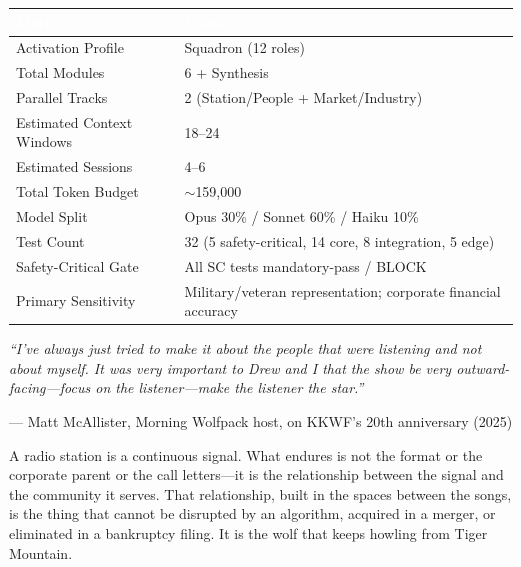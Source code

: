 \documentclass[11pt,letterpaper]{article}
\newcommand{\tableheader}[1]{\textbf{\sffamily\textcolor{white}{#1}}}
\begin{document}
\begin{center}
\begin{tabularx}{\textwidth}{L{4cm}X}
\toprule
{}
\tableheader{Metric} & \tableheader{Value} \\
\midrule
Activation Profile & Squadron (12 roles) \\
Total Modules & 6 + Synthesis \\
Parallel Tracks & 2 (Station/People + Market/Industry) \\
Estimated Context Windows & 18--24 \\
Estimated Sessions & 4--6 \\
Total Token Budget & $\sim$159,000 \\
Model Split & Opus 30\% / Sonnet 60\% / Haiku 10\% \\
Test Count & 32 (5 safety-critical, 14 core, 8 integration, 5 edge) \\
Safety-Critical Gate & All SC tests mandatory-pass / BLOCK \\
Primary Sensitivity & Military/veteran representation; corporate financial accuracy \\
\bottomrule
\end{tabularx}
\end{center}

\vspace{1em}

\begin{quotebox}
\textit{``I've always just tried to make it about the people that were listening and not about myself. It was very important to Drew and I that the show be very outward-facing---focus on the listener---make the listener the star.''}

\vspace{0.5em}
\hfill --- Matt McAllister, Morning Wolfpack host, on KKWF's 20th anniversary (2025)

\vspace{1em}
A radio station is a continuous signal. What endures is not the format or the corporate parent or the call letters---it is the relationship between the signal and the community it serves. That relationship, built in the spaces between the songs, is the thing that cannot be disrupted by an algorithm, acquired in a merger, or eliminated in a bankruptcy filing. It is the wolf that keeps howling from Tiger Mountain.
\end{quotebox}
\end{document}
